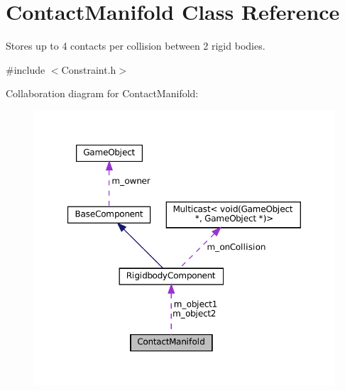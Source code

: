 \hypertarget{classContactManifold}{}\section{Contact\+Manifold Class Reference}
\label{classContactManifold}


Stores up to 4 contacts per collision between 2 rigid bodies.  




{\ttfamily \#include $<$Constraint.\+h$>$}



Collaboration diagram for Contact\+Manifold\+:
\nopagebreak
\begin{figure}[H]
\begin{center}
\leavevmode
\includegraphics[width=350pt]{classContactManifold__coll__graph}
\end{center}
\end{figure}
